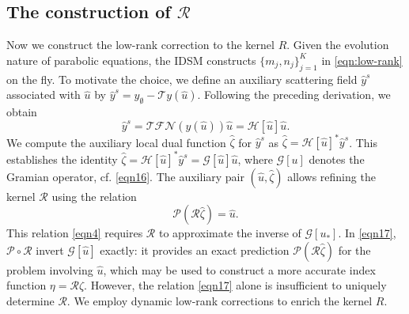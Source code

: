 \documentclass[onefignum,onetabnum]{siamart190516}
\numberwithin{equation}{section}
\begin{document}
\subsection{The construction of $\mathcal{R}$}\label{subsec:cro}
Now we construct the low-rank correction to the kernel $R$.
Given the evolution nature of parabolic equations, the IDSM constructs $\{m_j, n_j\}_{j=1}^K$ in \eqref{eqn:low-rank} on the fly.
To motivate the choice, we define an auxiliary scattering field $\hat{y}^s$ associated with $\hat{u}$ by $\hat{y}^s = y_\emptyset - \mathcal{T}y(\hat{u})$.
Following the preceding derivation, we obtain
\begin{equation*}
\hat{y}^s = \mathcal{T}\mathcal{F}\mathcal{N}(y(\hat{u}))\hat{u} = \mathcal{H}[\hat{u}]\hat{u}.
\end{equation*}
We compute the auxiliary local dual function $\hat{\zeta}$ for $\hat{y}^{s}$ as
$\hat{\zeta} = \mathcal{H}[\hat{u}]^* \hat{y}^s$. This establishes the identity $\hat{\zeta} = \mathcal{H}[\hat{u}]^* \hat{y}^{s} = \mathcal{G}[\hat{u}]\hat{u}$, where $\mathcal{G}[u]$ denotes the Gramian operator, cf. \eqref{eqn16}.
The auxiliary pair $(\hat{u}, \hat{\zeta})$ allows refining the kernel $\mathcal{R}$ using the relation
\begin{equation}\label{eqn17}
\mathcal{P}(\mathcal{R}\hat{\zeta}) = \hat{u}.
\end{equation}
This relation \eqref{eqn4} requires $\mathcal{R}$ to approximate the inverse of $\mathcal{G}[u_*]$.
In \eqref{eqn17}, $\mathcal{P}\circ\mathcal{R}$ invert $\mathcal{G}[\hat{u}]$ exactly: it provides an exact prediction $\mathcal{P}(\mathcal{R}\hat{\zeta})$ for the problem involving $\hat{u}$, which may be used to construct a more accurate index function $\eta = \mathcal{R}\zeta$.
However, the relation \eqref{eqn17} alone is insufficient to uniquely determine $\mathcal{R}$.
We employ dynamic low-rank corrections to enrich the kernel ${R}$.
\end{document}
